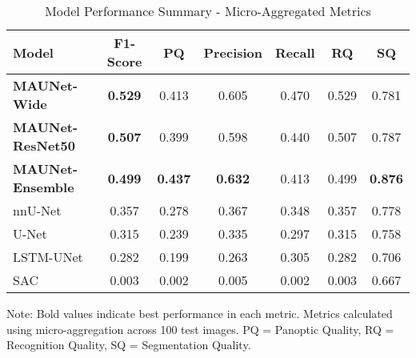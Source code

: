 \begin{table}[htbp]
\centering
\caption{Model Performance Summary - Micro-Aggregated Metrics}
\label{tab:model_performance}
\begin{tabular}{lcccccc}
\toprule
\textbf{Model} & \textbf{F1-Score} & \textbf{PQ} & \textbf{Precision} & \textbf{Recall} & \textbf{RQ} & \textbf{SQ} \\
\midrule
\textbf{MAUNet-Wide} & \textbf{0.529} & 0.413 & 0.605 & 0.470 & 0.529 & 0.781 \\
\textbf{MAUNet-ResNet50} & \textbf{0.507} & 0.399 & 0.598 & 0.440 & 0.507 & 0.787 \\
\textbf{MAUNet-Ensemble} & \textbf{0.499} & \textbf{0.437} & \textbf{0.632} & 0.413 & 0.499 & \textbf{0.876} \\
nnU-Net & 0.357 & 0.278 & 0.367 & 0.348 & 0.357 & 0.778 \\
U-Net & 0.315 & 0.239 & 0.335 & 0.297 & 0.315 & 0.758 \\
LSTM-UNet & 0.282 & 0.199 & 0.263 & 0.305 & 0.282 & 0.706 \\
SAC & 0.003 & 0.002 & 0.005 & 0.002 & 0.003 & 0.667 \\
\bottomrule
\end{tabular}
\begin{tablenotes}
\small
\item Note: Bold values indicate best performance in each metric. Metrics calculated using micro-aggregation across 100 test images. PQ = Panoptic Quality, RQ = Recognition Quality, SQ = Segmentation Quality.
\end{tablenotes}
\end{table}
